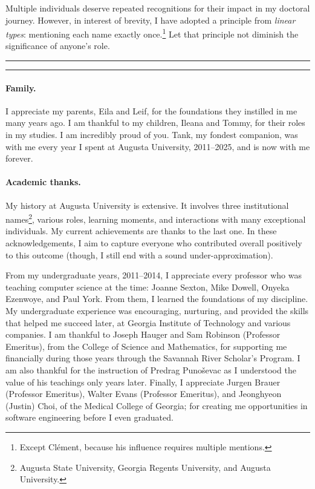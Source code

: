Multiple individuals deserve repeated recognitions for their impact in my doctoral journey.
However, in interest of brevity, I have adopted a principle from \emph{linear types}: mentioning each name exactly once.\footnote{Except Clément, because his influence requires multiple mentions.}
Let that principle not diminish the significance of anyone's role. %

\noindent\hfil\rule{0.25\textwidth}{.4pt}\hspace{1em}\raisebox{-0.5\height}{\SixFlowerAltPetal}\hspace{1em}\rule{0.25\textwidth}{.4pt}\hfil

\paragraph*{Family.}
I appreciate my parents, Eila and Leif, for the foundations they instilled in me many years ago.
I am thankful to my children, Ileana and Tommy, for their roles in my studies.
I am incredibly proud of you.
Tank, my fondest companion, was with me every year I spent at Augusta University, 2011--2025, and is now with me forever.

\paragraph*{Academic thanks.}
My history at {Augusta University} is extensive.
It involves three institutional names\footnote{Augusta State University, Georgia Regents University, and Augusta University.},
various roles, learning moments, and interactions with many exceptional individuals.
My current achievements are thanks to the last one.
In these acknowledgements, I aim to capture everyone who contributed overall positively to this outcome (though, I still end with a sound under-approximation).

From my undergraduate years, 2011--2014, I appreciate every professor who was teaching computer science at the time: Joanne Sexton, Mike Dowell, Onyeka Ezenwoye, and Paul York.
From them, I learned the foundations of my discipline.
My undergraduate experience was encouraging, nurturing, and provided the skills that helped me succeed later, at Georgia Institute of Technology and various companies.
I am thankful to Joseph Hauger and Sam Robinson (Professor Emeritus), from the College of Science and Mathematics, for supporting me financially during those years through the Savannah River Scholar's Program.
I am also thankful for the instruction of Predrag Punoševac as I understood the value of his teachings only years later.
Finally, I appreciate Jurgen Brauer (Professor Emeritus), Walter Evans (Professor Emeritus), and Jeonghyeon (Justin) Choi, of the Medical College of Georgia;
for creating me opportunities in software engineering before I even graduated.

